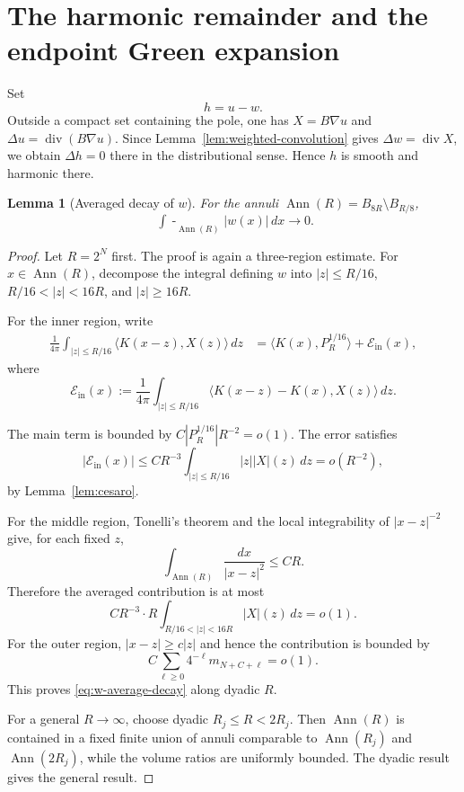 \documentclass[11pt]{amsart}
\numberwithin{equation}{section}
\newtheorem{lemma}[theorem]{Lemma}
\theoremstyle{definition}
\newcommand{\divE}{\operatorname{div}}
\newcommand{\Ann}{\operatorname{Ann}}
\newcommand{\fint}{\mathop{\!\!\int\!\!\!\!-}\nolimits}
\newcommand{\ip}[2]{\langle #1,#2\rangle}
\newcommand{\abs}[1]{\left\lvert #1\right\rvert}
\begin{document}
\section{The harmonic remainder and the endpoint Green expansion}
\label{sec:green}

Set
\begin{equation}\label{eq:h-def}
        h=u-w.
\end{equation}
Outside a compact set containing the pole, one has $X=B\nabla u$ and
$\Delta u=\divE(B\nabla u)$.  Since Lemma~\ref{lem:weighted-convolution} gives
$\Delta w=\divE X$, we obtain $\Delta h=0$ there in the distributional sense.
Hence $h$ is smooth and harmonic there.

\begin{lemma}[Averaged decay of $w$]\label{lem:w-average-decay}
For the annuli $\Ann(R)=B_{8R}\setminus B_{R/8}$,
\begin{equation}\label{eq:w-average-decay}
        \fint_{\Ann(R)}\abs{w(x)}\,dx\to0.
\end{equation}
\end{lemma}

\begin{proof}
Let $R=2^N$ first.  The proof is again a three-region estimate.  For $x\in\Ann(R)$, decompose the integral defining $w$ into $\abs z\le R/16$, $R/16<\abs z<16R$, and $\abs z\ge16R$.

For the inner region, write
\[
\begin{aligned}
        \frac1{4\pi}\int_{\abs z\le R/16}\ip{K(x-z)}{X(z)}\,dz
        &=\ip{K(x)}{P_R^{1/16}}+\mathcal E_{\mathrm{in}}(x),
\end{aligned}
\]
where
$$
        \mathcal E_{\mathrm{in}}(x):=\frac1{4\pi}\int_{\abs z\le R/16}
        \ip{K(x-z)-K(x)}{X(z)}\,dz .
$$

The main term is bounded by $C\abs{P_R^{1/16}}R^{-2}=o(1)$.  The error satisfies
$$
        \abs{\mathcal E_{\mathrm{in}}(x)}
        \le CR^{-3}\int_{\abs z\le R/16}\abs z\abs X(z)\,dz=o(R^{-2}),
$$
by Lemma~\ref{lem:cesaro}.

For the middle region, Tonelli's theorem and the local integrability of $\abs{x-z}^{-2}$ give, for each fixed $z$,
$$
        \int_{\Ann(R)}\frac{dx}{\abs{x-z}^2}\le CR.
$$
Therefore the averaged contribution is at most
$$
        C R^{-3}\cdot R\int_{R/16<\abs z<16R}\abs X(z)\,dz=o(1).
$$
For the outer region, $\abs{x-z}\ge c\abs z$ and hence the contribution is bounded by
$$
        C\sum_{\ell\ge0}4^{-\ell}m_{N+C+\ell}=o(1).
$$
This proves \eqref{eq:w-average-decay} along dyadic $R$.

For a general $R\to\infty$, choose dyadic $R_j\le R<2R_j$.  Then $\Ann(R)$ is contained in a fixed finite union of annuli comparable to $\Ann(R_j)$ and $\Ann(2R_j)$, while the volume ratios are uniformly bounded.  The dyadic result gives the general result.
\end{proof}
\end{document}
